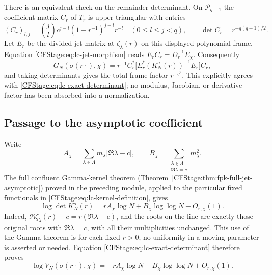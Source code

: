 There is an equivalent check on the remainder determinant. On
$\mathcal P_{q-1}$ the coefficient matrix $C_r$ of $T_r$ is upper triangular
with entries
\[
 (C_r)_{l,j}=\binom jl c^{j-l}(1-r^{-1})^{j-l}r^{-l}
 \quad(0\le l\le j<q),
 \qquad \det C_r=r^{-q(q-1)/2}.
 \tag{LC.16}\label{CFStage:eq:lc-coefficient-map}
\]
Let $E_r$ be the divided-jet matrix at $\zeta_\lambda(r)$ on this displayed
polynomial frame. Equation \eqref{CFStage:eq:lc-jet-morphism} reads
$E_rC_r=D_r^{-1}E_\chi$. Consequently
\[
 G_N(\sigma(r\cdot),\chi)
 =r^{-1}C_r^*\bigl[E_r^*(K_N^\sigma(r))^{-1}E_r\bigr]C_r,
\]
and taking determinants gives the total frame factor $r^{-q^2}$.
This explicitly agrees with \eqref{CFStage:eq:lc-exact-determinant}; no modulus,
Jacobian, or derivative factor has been absorbed into a normalization.

\subsection{Passage to the asymptotic coefficient}

Write
\[
 A_\chi=\sum_{\lambda\in\Lambda}m_\lambda|\Re\lambda-c|,
 \qquad
 B_\chi=\sum_{\substack{\lambda\in\Lambda\\\Re\lambda=c}}
 m_\lambda^2.
 \tag{LC.17}\label{CFStage:eq:lc-coefficients}
\]
The full confluent Gamma-kernel theorem
(Theorem~\ref{CFStage:thm:fpk-full-jet-asymptotic}) proved in the preceding module,
applied to the particular fixed functionals in
\eqref{CFStage:eq:lc-kernel-definition}, gives
\[
 \log\det K_N^\sigma(r)
 =rA_\chi\log N+B_\chi\log\log N+O_{r,\chi}(1).
 \tag{LC.18}\label{CFStage:eq:lc-inherited-kernel-law}
\]
Indeed, $\Re\zeta_\lambda(r)-c=r(\Re\lambda-c)$, and the roots on the
line are exactly those original roots with $\Re\lambda=c$, with all their
multiplicities unchanged. This use of the Gamma theorem is for each fixed
$r>0$; no uniformity in a moving parameter is asserted or needed.
Equation \eqref{CFStage:eq:lc-exact-determinant} therefore proves
\[
 \log V_N(\sigma(r\cdot),\chi)
 =-rA_\chi\log N-B_\chi\log\log N+O_{r,\chi}(1).
 \tag{LC.19}\label{CFStage:eq:lc-dilated-asymptotic}
\]

